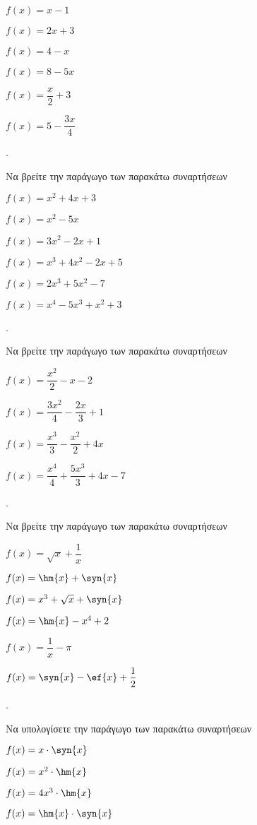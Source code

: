 \documentclass[11pt,a4paper,twocolumn]{article}
\newcounter{askhsh}
\newcommand{\askhsh}{{\large\theaskhsh.}\ \addtocounter{askhsh}{1}}
\begin{document}
\begin{alist}
\begin{multicols}{2}
\item $ f(x)=x-1 $
\item $ f(x)=2x+3 $
\item $ f(x)=4-x $
\item $ f(x)=8-5x $
\item $ f(x)=\dfrac{x}{2}+3 $
\item $ f(x)=5-\dfrac{3x}{4} $
\end{multicols}
\end{alist}
\askhsh Να βρείτε την παράγωγο των παρακάτω συναρτήσεων
\begin{alist}
\item $ f(x)=x^2+4x+3 $
\item $ f(x)=x^2-5x $
\item $ f(x)=3x^2-2x+1 $
\item $ f(x)=x^3+4x^2-2x+5 $
\item $ f(x)=2x^3+5x^2-7 $
\item $ f(x)=x^4-5x^3+x^2+3 $
\end{alist}
\askhsh Να βρείτε την παράγωγο των παρακάτω συναρτήσεων
\begin{alist}
\item $ f(x)=\dfrac{x^2}{2}-x-2 $
\item $ f(x)=\dfrac{3x^2}{4}-\dfrac{2x}{3}+1 $
\item $ f(x)=\dfrac{x^3}{3}-\dfrac{x^2}{2}+4x $
\item $ f(x)=\dfrac{x^4}{4}+\dfrac{5x^3}{3}+4x-7 $
\end{alist}
\askhsh Να βρείτε την παράγωγο των παρακάτω συναρτήσεων
\begin{alist}
\item $ f(x)=\sqrt{x}+\dfrac{1}{x} $
\item $ f(x)=\hm{x}+\syn{x} $
\item $ f(x)=x^3+\sqrt{x}+\syn{x} $
\item $ f(x)=\hm{x}-x^4+2 $
\item $ f(x)=\dfrac{1}{x}-\pi $
\item $ f(x)=\syn{x}-\ef{x}+\dfrac{1}{2} $
\end{alist}
\askhsh Να υπολογίσετε την παράγωγο των παρακάτω συναρτήσεων
\begin{multicols}{2}
\begin{alist}
\item $ f(x)=x\cdot\syn{x} $
\item $ f(x)=x^2\cdot\hm{x} $
\item $ f(x)=4x^3\cdot\hm{x} $
\item $ f(x)=\hm{x}\cdot\syn{x} $
\end{alist}
\end{multicols}
\end{document}
